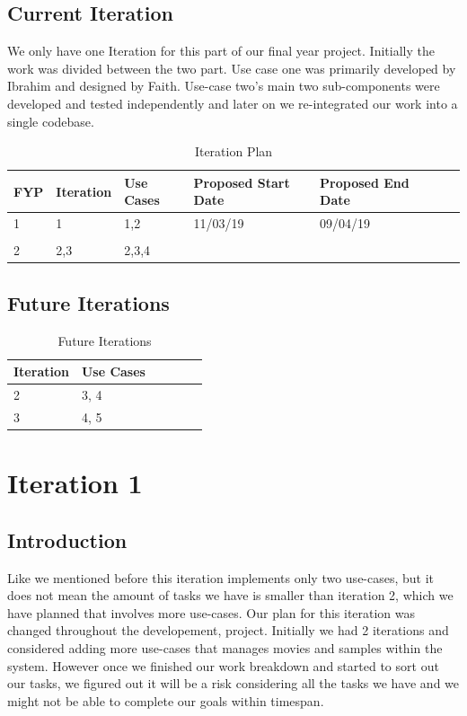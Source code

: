 \documentclass[12pt,a4paper,man]{report}
\begin{document}
\section{Current Iteration}
\label{sec:org6f34034}
We only have one Iteration for this part of our final year project. Initially the work was divided between the two part. Use case one was primarily developed by Ibrahim and designed by Faith. Use-case two's main two sub-components were developed and tested independently and later on we re-integrated our work into a single codebase.

\begin{table}[htbp]
\caption{\label{table:iterplan}
Iteration Plan}
\centering
\begin{tabular}{|l|l|l|l|l|lp{3cm}|}
\hline
\textbf{FYP} & \textbf{Iteration} & \textbf{Use Cases} & \textbf{Proposed Start Date} & \textbf{Proposed End Date}\\
\hline
1 & 1 & 1,2 & 11/03/19 & 09/04/19\\
 &  &  &  & \\
\hline
2 & 2,3 & 2,3,4 &  & \\
\hline
\end{tabular}
\end{table}


\section{Future Iterations}
\label{sec:orge5291ad}

\begin{table}[htbp]
\caption{\label{table:fuiterplan}
Future Iterations}
\centering
\begin{tabular}{|l|l|l|l|lp{3cm}|}
\hline
\textbf{Iteration} & \textbf{Use Cases} \footnotemark\\
\hline
2 & 3, 4\\
3 & 4, 5\\
\hline
\end{tabular}
\end{table}


\chapter{Iteration 1}
\label{sec:org3ffd719}
\section{Introduction}
\label{sec:org52fa4a6}
Like we mentioned before this iteration implements only two use-cases, but it does not mean the amount of tasks we have is smaller than iteration 2, which we have planned that involves more use-cases. Our plan for this iteration was changed throughout the developement, project. Initially we had 2 iterations and considered adding more use-cases that manages movies and samples within the system. However once we finished our work breakdown and started to sort out our tasks, we figured out it will be a risk considering all the tasks we have and we might not be able to complete our goals within timespan. 
\end{document}

